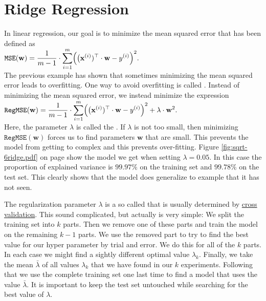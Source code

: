 \section{Ridge Regression}
In linear regression, our goal is to minimize the mean squared error that has been defined as
\\[0.2cm]
\hspace*{1.3cm}
$
  \displaystyle
  \mathtt{MSE}(\mathbf{w}) =
  \frac{1}{m-1} \cdot \sum\limits_{i=1}^m \Bigl(\bigl(\mathbf{x}^{(i)})^\top \cdot \mathbf{w}  - y^{(i)}\Bigr)^2.
$
\\[0.2cm]
The previous example has shown that sometimes minimizing the mean squared error leads to overfitting.
One way to avoid overfitting is called .  Instead of minimizing the mean squared error,
we instead minimize the expression
\\[0.2cm]
\hspace*{1.3cm}
$
  \displaystyle
  \mathtt{RegMSE}(\mathbf{w}) =
  \frac{1}{m-1} \cdot \sum\limits_{i=1}^m \Bigl(\bigl(\mathbf{x}^{(i)})^\top \cdot \mathbf{w}  - y^{(i)}\Bigr)^2
  + \lambda \cdot \mathbf{w}^2.
$
\\[0.2cm]
Here, the parameter $\lambda$ is called the .  
If $\lambda$ is not too small,
then minimizing $\mathtt{RegMSE}(\mathbf{w})$ forces us to find parameters $\mathbf{w}$ that are small.  This
prevents the model from getting to complex and this prevents over-fitting.  Figure \ref{fig:sqrt-6ridge.pdf} on
page \pageref{fig:sqrt-6ridge.pdf} show the model we get when setting $\lambda = 0.05$.  In this case the
proportion of explained variance is $99.97\%$
on the training set and $99.78\%$ on the test set.  This clearly shows that the model does generalize to
example that it has not seen.

The regularization parameter $\lambda$ is a so called  
 that is usually determined by
\href{https://en.wikipedia.org/wiki/Cross-validation_(statistics)}{cross  validation}.  This sound complicated,
but actually is very simple:  We split the training set into $k$ parts.  Then we remove one of these parts and
train the model on the remaining $k-1$ parts.  We use the removed part to try to find the best value for our
hyper parameter by trial and error.  We do this for all of the $k$ parts.  In each case we might find a sightly
different optimal value $\lambda_k$.  Finally, we take the mean $\bar{\lambda}$ of all values $\lambda_k$ that
we have found in our $k$ experiments.
Following that we use the complete training set one last time to find a model that uses the value
$\bar{\lambda}$.  It is important to keep the test set untouched while searching for the best value of $\lambda$.




